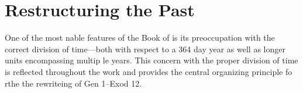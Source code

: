 
\section{Restructuring the Past}

One of the most nable features of the Book of \jub is its preoccupation with the correct division of time---both with respect to a 364 day year as well as longer units encompassing multip le years. This concern with the proper division of time is reflected throughout the work and provides the central organizing principle fo rthe the rewriteing of Gen 1--Exod 12.

